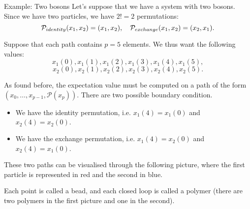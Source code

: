 \documentclass[a4paper]{article}
\begin{document}
\begin{parag}{Example: Two bosons}
    Let's suppose that we have a system with two bosons. Since we have two particles, we have $2! = 2$ permutations: 
    \[\mathcal{P}_{identity}\left(x_1, x_2\right) = \left(x_1, x_2\right), \mathspace \mathcal{P}_{exchange}\left(x_1, x_2\right) = \left(x_2, x_1\right).\]
    
    Suppose that each path contains $p = 5$ elements. We thus want the following values:
    \[x_1\left(0\right), x_1\left(1\right), x_1\left(2\right), x_1\left(3\right), x_1\left(4\right), x_1\left(5\right),\]
    \[x_2\left(0\right), x_2\left(1\right), x_2\left(2\right), x_2\left(3\right), x_2\left(4\right), x_2\left(5\right).\]

    As found before, the expectation value must be computed on a path of the form $\left(x_0, \ldots, x_{p-1}, \mathcal{P}\left(x_p\right)\right)$. There are two possible boundary condition.
    \begin{itemize}
        \item We have the identity permutation, i.e. $x_1\left(4\right) = x_1\left(0\right)$ and $x_2\left(4\right) = x_2\left(0\right)$.
        \item We have the exchange permutation, i.e. $x_1\left(4\right) = x_2\left(0\right)$ and $x_2\left(4\right) = x_1\left(0\right)$.
    \end{itemize}
    
    These two paths can be visualised through the following picture, where the first particle is represented in red and the second in blue.

    Each point is called a bead, and each closed loop is called a polymer (there are two polymers in the first picture and one in the second).
\end{parag}
\end{document}
